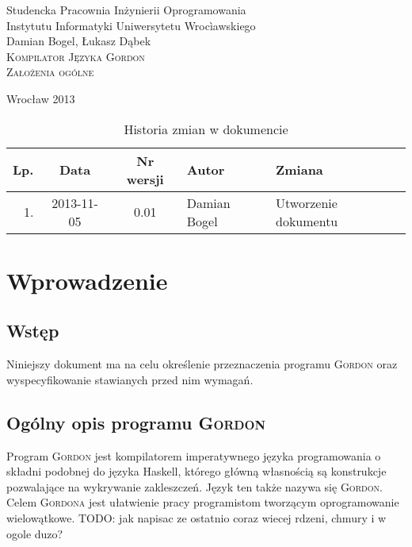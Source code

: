 \documentclass{documentation}
\begin{document}
\begin{titlepage}
\begin{center}
Studencka Pracownia Inżynierii Oprogramowania\\
Instytutu Informatyki Uniwersytetu Wrocìawskiego\\[6cm]

Damian Bogel, Łukasz Dąbek\\[1cm]
\textsc{\LARGE Kompilator Języka Gordon}\\[0.5cm]
\textsc{\large Założenia ogólne}

\vfill
Wrocław 2013 \\[2.5cm]

\end{center}
\end{titlepage}

\newpage
\begin{table}
	\centering
	\caption{Historia zmian w dokumencie}
		\begin{tabular}{|r|c|c|l|l|}
		\hline
		Lp.  & Data       & Nr wersji & Autor                 & Zmiana \\ \hline
		1.   & 2013-11-05 & 0.01 & Damian Bogel & Utworzenie dokumentu \\ \hline
	\end{tabular}
\end{table}
\newpage

\tableofcontents
\setcounter{page}{2}

\newpage

\section{Wprowadzenie}
\subsection{Wstęp}
\noindent Niniejszy dokument ma na celu określenie przeznaczenia programu \textsc{Gordon} oraz wyspecyfikowanie stawianych przed nim wymagań.

\subsection{Ogólny opis programu \textsc{Gordon}}
\noindent Program \textsc{Gordon} jest kompilatorem imperatywnego języka  programowania o składni podobnej do języka Haskell, którego główną własnością są konstrukcje pozwalające na wykrywanie zakleszczeń. Język ten także nazywa się \textsc{Gordon}.
Celem \textsc{Gordona} jest ułatwienie pracy programistom tworzącym oprogramowanie wielowątkowe. TODO: jak napisac ze ostatnio coraz wiecej rdzeni, chmury i w ogole duzo?
\end{document}
